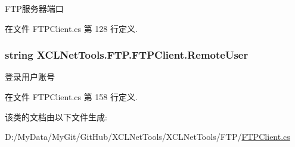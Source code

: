 F\-T\-P服务器端口 



在文件 F\-T\-P\-Client.\-cs 第 128 行定义.

\hypertarget{class_x_c_l_net_tools_1_1_f_t_p_1_1_f_t_p_client_ab97c698dca9a54f44b1e69cb15c1126d}{
\subsubsection[{Remote\-User}]{\setlength{\rightskip}{0pt plus 5cm}string X\-C\-L\-Net\-Tools.\-F\-T\-P.\-F\-T\-P\-Client.\-Remote\-User\hspace{0.3cm}{\ttfamily [set]}}}\label{class_x_c_l_net_tools_1_1_f_t_p_1_1_f_t_p_client_ab97c698dca9a54f44b1e69cb15c1126d}


登录用户账号 



在文件 F\-T\-P\-Client.\-cs 第 158 行定义.



该类的文档由以下文件生成\-:\begin{DoxyCompactItemize}
\item 
D\-:/\-My\-Data/\-My\-Git/\-Git\-Hub/\-X\-C\-L\-Net\-Tools/\-X\-C\-L\-Net\-Tools/\-F\-T\-P/\hyperlink{_f_t_p_client_8cs}{F\-T\-P\-Client.\-cs}\end{DoxyCompactItemize}
